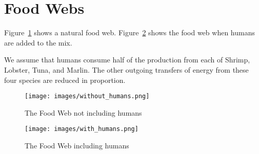 \section{Food Webs}
\label{sec:food-webs}

Figure~\ref{fig:without-humans} shows a natural food web.
Figure~\ref{fig:with-humans} shows the food web when humans are added to the mix.

We assume that humans consume half of the production from each of Shrimp, Lobster, Tuna, and Marlin.
The other outgoing transfers of energy from these four species are reduced in proportion.

\begin{figure}[ht!]
    \centering
    \texttt{[image: images/without\_humans.png]}
    \caption{The Food Web not including humans}
    \label{fig:without-humans}
\end{figure}

\begin{figure}[ht!]
    \centering
    \texttt{[image: images/with\_humans.png]}
    \caption{The Food Web including humans}
    \label{fig:with-humans}
\end{figure}
